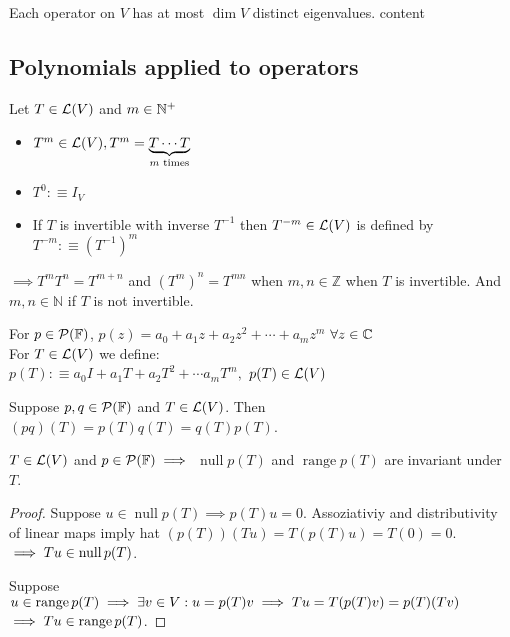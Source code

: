 \begin{thm}
    Each operator on $V$ has at most $\dim V$ distinct eigenvalues.
    content
\end{thm}

\paragraph{}

\subsection{Polynomials applied to operators}

\setcounter{thm}{12}
\begin{mydef}
    Let $T \in \mathcal{L}(V)$ and $m\in \mathbb{N}^{+}$ 
    \begin{itemize}
        \item $T^{m} \in \mathcal{L}(V), T^{m} = \underbrace{T \cdots T}_{\text{$m$ times}}$
        \item $T^0 :\equiv I_V$
        \item If $T$ is invertible with inverse $T^{-1}$ then $T^{-m}\in \mathcal{L}(V)$ is defined by $T^{-m} :\equiv (T^{-1})^m$ 
    \end{itemize}
\end{mydef}
$\implies T^m T^n = T^{m+n}$ and $(T^m)^n=T^{mn}$ when $m,n \in \mathbb{Z}$ when $T$ is invertible. And $m,n \in \mathbb{N}$ if $T$ is not invertible.

\begin{mydef}
    For $p \in \mathcal{P} ({\mathbb{F}})$, $p(z) = a_0+a_1z+a_2z^2+\cdots+a_mz^m$ 
    $\forall z \in \mathbb{C}$\\
    For $T \in \mathcal{L} (V)$ we define: \\
    $p(T) :\equiv a_0 I + a_1 T + a_2 T^2 + \cdots a_m T^m,$ $p(T) \in \mathcal{L}(V)$
\end{mydef}



\setcounter{thm}{16}
\begin{thm}
    \label{multiplicative-properties}
    Suppose $p,q \in \mathcal{P} ({\mathbb{F}})$ and $T\in \mathcal{L} (V)$. Then $(p q)(T) = p(T) q(T) = q(T)p(T)$.
\end{thm}

\begin{thm}
    \label{null-space-and-range-of-p(T)-are-invariant-under-T}
    $T \in \mathcal{L}(V)$ and $p\in \mathcal{P} ({\mathbb{F}}) \implies$
    $\operatorname{null} p(T)$ and $\operatorname{range} p(T)$ are invariant under $T$.
\end{thm}
\begin{proof}
    Suppose $u\in \operatorname{null} p(T) \implies p(T)u = 0$. Assoziativiy and distributivity of linear maps imply hat $(p(T))(Tu)=T(p(T)u)=T(0)=0$.$\implies Tu \in \operatorname{null} p(T)$.
    
    Suppose $u \in \operatorname{range} p(T) \implies \exists v\in V: u=p(T)v \implies Tu=T(p(T)v)=p(T)(Tv)$ \\ 
    $\implies Tu \in \operatorname{range} p(T)$.
\end{proof}

